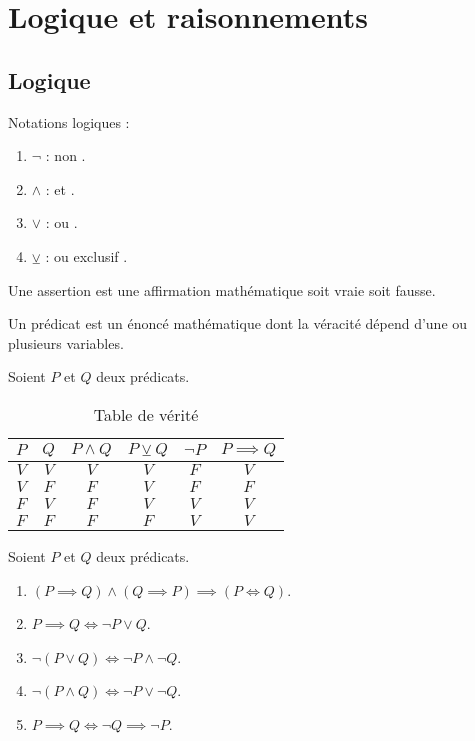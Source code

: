 \chapter{Logique et raisonnements}

\section{Logique}
\noindent Notations logiques :
\begin{enumerate}
	\item $\neg$ : \og non \fg.
	\item $\land$ : \og et \fg.
	\item $\lor$ : \og ou \fg.
	\item $\veebar$ : \og ou exclusif \fg.
\end{enumerate}

\begin{definition}[Assertion]
  Une assertion est une affirmation mathématique soit vraie soit fausse.
\end{definition}

\begin{definition}[Prédicat]
  Un prédicat est un énoncé mathématique dont la véracité dépend d'une ou plusieurs variables.
\end{definition}

Soient $P$ et $Q$ deux prédicats.
\begin{table}[!h]
	\centering
	\begin{tabular}{cccccc}
		\toprule
		$P$ & $Q$ & $P \land Q$ & $P \veebar Q$ & $\neg P$ & $P \implies Q$ \\
		\midrule
		$V$ & $V$ & $V$ & $V$ & $F$ & $V$ \\
		$V$ & $F$ & $F$ & $V$ & $F$ & $F$ \\
		$F$ & $V$ & $F$ & $V$ & $V$ & $V$ \\
		$F$ & $F$ & $F$ & $F$ & $V$ & $V$ \\
		\bottomrule
	\end{tabular}
	\caption{Table de vérité}
\end{table}

\begin{proposition}
  Soient $P$ et $Q$ deux prédicats.  
	\begin{enumerate} 
		\item $(P \implies Q) \land (Q \implies P) \implies (P \iff Q)$.
		\item $P \implies Q \iff \neg P \lor Q$.
		\item $\neg (P \lor Q) \iff \neg P \land \neg Q$.
		\item $\neg (P \land Q) \iff \neg P \lor \neg Q$.
		\item $P \implies Q \iff \neg Q \implies \neg P$.
	\end{enumerate}
\end{proposition}

